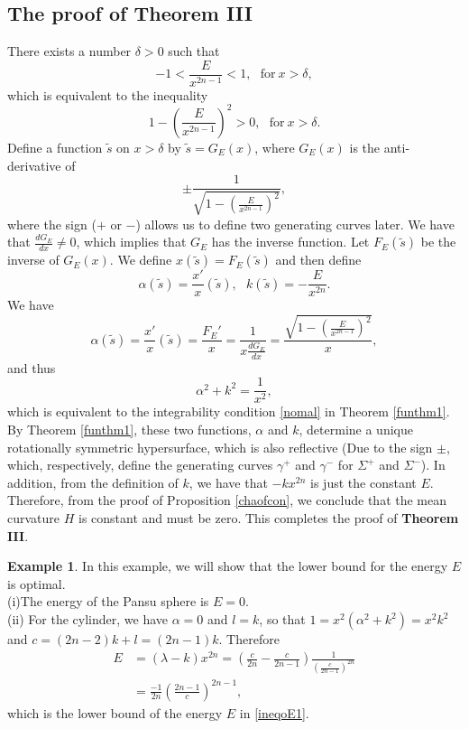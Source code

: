 \documentclass[12pt]{amsart}
\theoremstyle{definition}\newtheorem{exa}[thm]{\sc Example}
\theoremstyle{definition}\newtheorem{de}[thm]{\sc Definition}
\theoremstyle{definition}\newtheorem{rem}[thm]{\sc Remark}
\theoremstyle{definition}\newtheorem{prob}[thm]{\it Problem}
\theoremstyle{definition}\newtheorem{fact}[thm]{\sc Fact}
\theoremstyle{definition}\newtheorem{claim}[thm]{\sc Claim}
\numberwithin{equation}{section}
\begin{document}
\subsection{The proof of {\bf Theorem III}}

There exists a number $\delta>0$ such that
\[-1<\frac{E}{x^{2n-1}}<1,\ \ \ \textrm{for}\ x>\delta,\]
which is equivalent to the inequality
\[1-\left(\frac{E}{x^{2n-1}}\right)^{2}>0,\ \ \ \textrm{for}\ x>\delta.\]
Define a function $\tilde{s}$ on $x>\delta$ by $\tilde{s}=G_{E}(x)$, where $G_{E}(x)$ is the anti-derivative of 
\[\pm \frac{1}{\sqrt{1-\left(\frac{E}{x^{2n-1}}\right)^{2}}},\]
where the sign ($+$ or $-$) allows us to define two generating curves later. We have that $\frac{dG_{E}}{dx}\neq 0$, which implies that $G_{E}$ has the inverse function. Let $F_{E}(\tilde{s})$ be the inverse of $G_{E}(x)$. We define $x(\tilde{s})=F_{E}(\tilde{s})$ and then define
\[\alpha(\tilde{s})=\frac{x'}{x}(\tilde{s}),\ \ \ k(\tilde{s})=-\frac{E}{x^{2n}}.\]
We have 
\[\alpha(\tilde{s})=\frac{x'}{x}(\tilde{s})=\frac{F_{E}'}{x}=\frac{1}{x\frac{dG_{E}}{dx}}=\frac{\sqrt{1-\left(\frac{E}{x^{2n-1}}\right)^{2}}}{x},\]
and thus
\[\alpha^{2}+k^{2}=\frac{1}{x^{2}},\]
which is equivalent to the integrability condition \eqref{nomal} in Theorem \ref{funthm1}. By Theorem \ref{funthm1}, these two functions, $\alpha$ and $k$, determine a unique rotationally symmetric hypersurface, which is also reflective (Due to the sign $\pm$, which, respectively, define the generating curves $\gamma^{+}$ and $\gamma^{-}$ for $\Sigma^{+}$ and $\Sigma^{-}$).  In addition, from the definition of $k$, we have that $-kx^{2n}$ is just the constant $E$. Therefore, from the proof of Proposition \ref{chaofcon}, we conclude that the mean curvature $H$ is constant and must be zero. This completes the proof of {\bf Theorem III}.


\begin{exa}\label{optex}
In this example, we will show that the lower bound for the energy $E$ is optimal.\\
(i)The energy of the Pansu sphere is $E=0$.\\
(ii) For the cylinder, we have $\alpha=0$ and $l=k$, so that $1=x^{2}(\alpha^{2}+k^{2})=x^{2}k^{2}$ and $c=(2n-2)k+l=(2n-1)k$. 
Therefore
\[\begin{split}
E&=(\lambda-k)x^{2n}=\left(\frac{c}{2n}-\frac{c}{2n-1}\right)\frac{1}{\left(\frac{c}{2n-1}\right)^{2n}}\\
&=\frac{-1}{2n}\left(\frac{2n-1}{c}\right)^{2n-1},
\end{split}\]
which is the lower bound of the energy $E$ in \eqref{ineqoE1}.
\end{exa}
\end{document}
